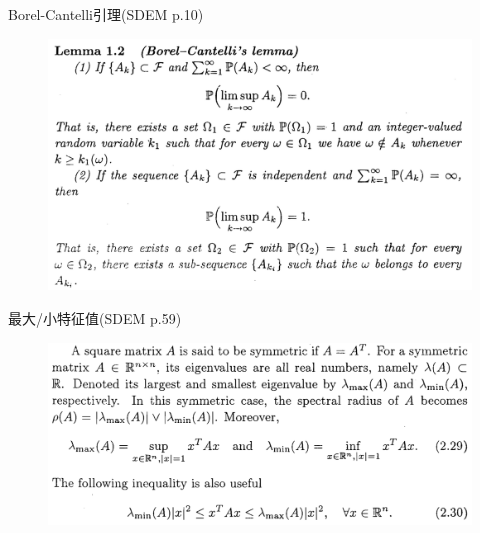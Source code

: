 \documentclass[10pt,aspectratio=43]{beamer}
\begin{document}
\begin{frame}{Borel-Cantelli引理(SDEM p.10)}
\begin{figure}
\centering
\includegraphics[width=\linewidth]{4}
\end{figure}
\end{frame}

\begin{frame}{最大/小特征值(SDEM p.59)}
\begin{figure}
\centering
\includegraphics[width=\linewidth]{5}
\end{figure}
\end{frame}
\end{document}
